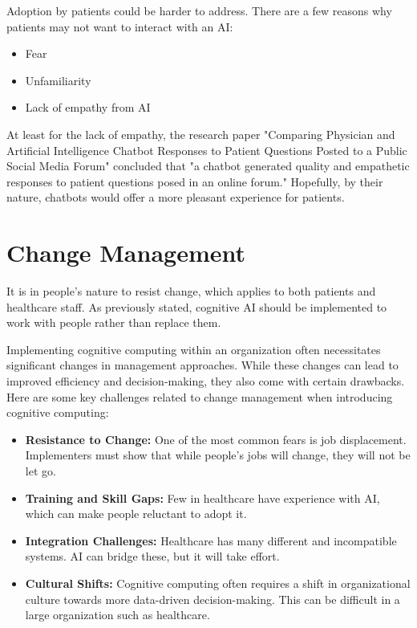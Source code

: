 \documentclass{article}
\begin{document}
Adoption by patients could be harder to address. There are a few reasons why patients may not want to interact with an AI:
\begin{itemize}
	\item Fear
	\item Unfamiliarity
	\item Lack of empathy from AI
\end{itemize}
At least for the lack of empathy, the research paper "Comparing Physician and Artificial Intelligence Chatbot Responses to Patient Questions Posted to a Public Social Media Forum" \cite{bedside} concluded that "a chatbot generated quality and empathetic responses to patient questions posed in an online forum." Hopefully, by their nature, chatbots would offer a more pleasant experience for patients.

\section{Change Management}
It is in people's nature to resist change, which applies to both patients and healthcare staff. As previously stated, cognitive AI should be implemented to work with people rather than replace them.

Implementing cognitive computing within an organization often necessitates significant changes in management approaches. While these changes can lead to improved efficiency and decision-making, they also come with certain drawbacks. Here are some key challenges related to change management when introducing cognitive computing:

\begin{itemize}
\item \textbf{Resistance to Change:} One of the most common fears is job displacement. Implementers must show that while people's jobs will change, they will not be let go.
\item \textbf{Training and Skill Gaps:} Few in healthcare have experience with AI, which can make people reluctant to adopt it.
\item \textbf{Integration Challenges:} Healthcare has many different and incompatible systems. AI can bridge these, but it will take effort.
\item \textbf{Cultural Shifts:} Cognitive computing often requires a shift in organizational culture towards more data-driven decision-making. This can be difficult in a large organization such as healthcare.
\end{itemize}
\end{document}
